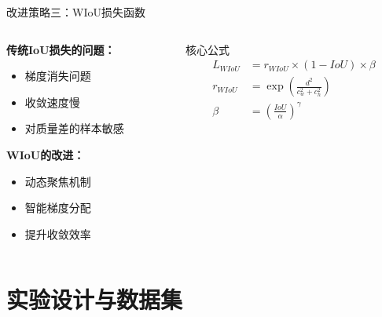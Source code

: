 \documentclass[aspectratio=169]{beamer}
\begin{document}
\begin{frame}{改进策略三：WIoU损失函数}
    \begin{columns}
        \begin{column}{0.6\textwidth}
            \textbf{传统IoU损失的问题：}
            \begin{itemize}
                \item 梯度消失问题
                \item 收敛速度慢
                \item 对质量差的样本敏感
            \end{itemize}
            
            \vspace{0.5cm}
            \textbf{WIoU的改进：}
            \begin{itemize}
                \item 动态聚焦机制
                \item 智能梯度分配
                \item 提升收敛效率
            \end{itemize}
        \end{column}
        \begin{column}{0.4\textwidth}
            \begin{block}{核心公式}
                \begin{align*}
                    L_{WIoU} &= r_{WIoU} \times (1-IoU) \times \beta \\
                    r_{WIoU} &= \exp\left(\frac{d^2}{c_w^2 + c_h^2}\right) \\
                    \beta &= \left(\frac{IoU}{\alpha}\right)^{\gamma}
                \end{align*}
            \end{block}
        \end{column}
    \end{columns}
\end{frame}

\section{实验设计与数据集}
\end{document}
